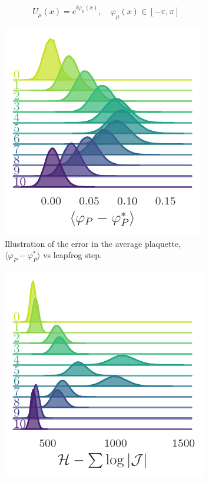\documentclass{article} %
\begin{document}
\begin{equation}
   U_{\mu}(x) = e^{i\varphi_{\mu}(x)}, \quad \varphi_{\mu}(x) \in \left[-\pi, \pi\right]
\end{equation}
%
\begin{figure}[htpb]
   \centering
   \begin{subfigure}{0.31\textwidth}
      \includegraphics[width=\textwidth]{figures/plaqsf.pdf}
      \caption{\label{fig:plaqsf}Illustration of the error in the average plaquette,
      \(\langle\varphi_{P}-\varphi_{P}^{*}\rangle\) vs leapfrog step.}
   \end{subfigure}
   \hfill
   \begin{subfigure}{0.31\textwidth}
      \includegraphics[width=\textwidth]{figures/hwf.pdf}

\end{subfigure}
\end{figure}
\end{document}
